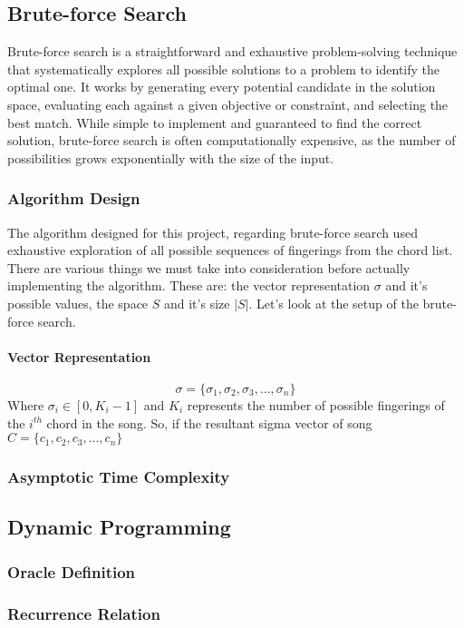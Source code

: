 \documentclass[conference]{IEEEtran}
\begin{document}
\subsection{Brute-force Search}
Brute-force search is a straightforward and exhaustive problem-solving technique that systematically explores all possible solutions to a problem to identify the optimal one. It works by generating every potential candidate in the solution space, evaluating each against a given objective or constraint, and selecting the best match. While simple to implement and guaranteed to find the correct solution, brute-force search is often computationally expensive, as the number of possibilities grows exponentially with the size of the input. 
\subsubsection{Algorithm Design}
The algorithm designed for this project, regarding brute-force search used exhaustive exploration of all possible sequences of fingerings from the chord list. There are various things we must take into consideration before actually implementing the algorithm. These are: the vector representation \( \sigma \) and it's possible values, the space \(S\) and it's size \(|S|\). Let's look at the setup of the brute-force search.
\paragraph{Vector Representation}
\[
    \sigma = \{\sigma_1, \sigma_2, \sigma_3, \ldots, \sigma_n\}
\]
Where \(\sigma_i \in [0, K_i - 1]\) and \( K_i \) represents the number of possible fingerings of the $i^{th}$ chord in the song. So, if the resultant sigma vector of song \(C=\{c_1, c_2, c_3, \dots, c_n\}\)

\subsubsection{Asymptotic Time Complexity}

\subsection{Dynamic Programming}

\subsubsection{Oracle Definition}

\subsubsection{Recurrence Relation}
\end{document}
